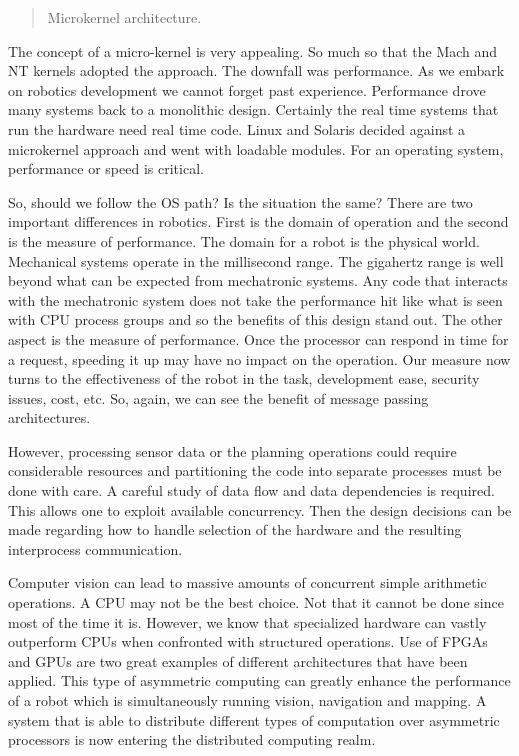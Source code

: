 \begin{quote}
Microkernel architecture.
\end{quote}

The concept of a micro-kernel is very appealing. So much so that the
Mach and NT kernels adopted the approach. The downfall was performance.
As we embark on robotics development we cannot forget past experience.
Performance drove many systems back to a monolithic design. Certainly
the real time systems that run the hardware need real time code. Linux
and Solaris decided against a microkernel approach and went with
loadable modules. For an operating system, performance or speed is
critical.

So, should we follow the OS path? Is the situation the same? There are
two important differences in robotics. First is the domain of operation
and the second is the measure of performance. The domain for a robot is
the physical world. Mechanical systems operate in the millisecond range.
The gigahertz range is well beyond what can be expected from mechatronic
systems. Any code that interacts with the mechatronic system does not
take the performance hit like what is seen with CPU process groups and
so the benefits of this design stand out. The other aspect is the
measure of performance. Once the processor can respond in time for a
request, speeding it up may have no impact on the operation. Our measure
now turns to the effectiveness of the robot in the task, development
ease, security issues, cost, etc. So, again, we can see the benefit of
message passing architectures.

However, processing sensor data or the planning operations could require
considerable resources and partitioning the code into separate processes
must be done with care. A careful study of data flow and data
dependencies is required. This allows one to exploit available
concurrency. Then the design decisions can be made regarding how to
handle selection of the hardware and the resulting interprocess
communication.

Computer vision can lead to massive amounts of concurrent simple
arithmetic operations. A CPU may not be the best choice. Not that it
cannot be done since most of the time it is. However, we know that
specialized hardware can vastly outperform CPUs when confronted with
structured operations. Use of FPGAs and GPUs are two great examples of
different architectures that have been applied. This type of asymmetric
computing can greatly enhance the performance of a robot which is
simultaneously running vision, navigation and mapping. A system that is
able to distribute different types of computation over asymmetric
processors is now entering the distributed computing realm.

